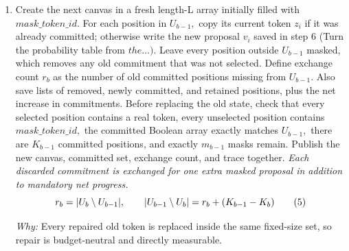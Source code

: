 \documentclass[10pt,a4paper]{article}
\begin{document}
\begin{enumerate}[leftmargin=*,start=6]
\begin{equation}
\resizebox{\ifdim\width>\linewidth \linewidth\else\width\fi}{!}{$\displaystyle U_{b-1}=\operatorname{TopK}_{i\in\{1,\ldots,L\}}(s_i;K_{b-1})$} \tag{4}
\end{equation}
\par\emph{Why:} The deadline fixes only how many positions must remain committed;\allowbreak{} current model evidence decides which positions they are.
  \item Create the next canvas in a fresh length-L array initially filled with \(\mathit{mask\_token\_id}.\) For each position in \(U_{b-1},\) copy its current token \(z_{i}\) if it was already committed;\allowbreak{} otherwise write the new proposal \(v_{i}\) saved in step 6 (Turn the probability table from \(the\dots ).\) Leave every position outside \(U_{b-1}\) masked, which removes any old commitment that was not selected. Define exchange count \(r_{b}\) as the number of old committed positions missing from \(U_{b-1}.\) Also save lists of removed, newly committed, and retained positions, plus the net increase in commitments. Before replacing the old state, check that every selected position contains a real token, every unselected position contains \(\mathit{mask\_token\_id},\) the committed Boolean array exactly matches \(U_{b-1},\) there are \(K_{b-1}\) committed positions, and exactly \(m_{b-1}\) masks remain. Publish the new canvas, committed set, exchange count, and trace together.
\noindent\emph{Each discarded commitment is exchanged for one extra masked proposal in addition to mandatory net progress.}
\begin{equation}
\resizebox{\ifdim\width>\linewidth \linewidth\else\width\fi}{!}{$\displaystyle r_b=|U_b\setminus U_{b-1}|,\qquad |U_{b-1}\setminus U_b|=r_b+(K_{b-1}-K_b)$} \tag{5}
\end{equation}
\par\emph{Why:} Every repaired old token is replaced inside the same fixed-size set, so repair is budget-neutral and directly measurable.
\end{enumerate}
\end{document}

